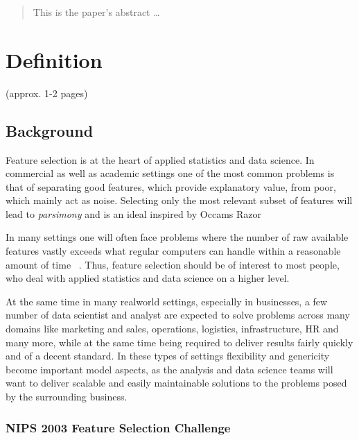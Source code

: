 \documentclass[12pt]{article}
\begin{document}
\maketitle


\begin{abstract}
This is the paper's abstract \ldots
\end{abstract}

\tableofcontents


\section{Definition}\label{definition}

(approx. 1-2 pages)

\subsection{Background}
Feature selection is at the heart of applied statistics and data science. In commercial as well as academic settings one of the most common problems is that of separating good features, which provide explanatory value, from poor, which mainly act as noise. Selecting only the most relevant subset of features will lead to \emph{parsimony} and is an ideal inspired by Occams Razor ~\cite{wiki:occam}

In many settings one will often face problems where the number of raw available features vastly exceeds what regular computers can handle within a reasonable amount of time ~\cite{mboostintro}. Thus, feature selection should be of interest to most people, who deal with applied statistics and data science on a higher level.

At the same time in many realworld settings, especially in businesses, a few number of data scientist and analyst are expected to solve problems across many domains like marketing and sales, operations, logistics, infrastructure, HR and many more, while at the same time being required to deliver results fairly quickly and of a decent standard. In these types of settings flexibility and genericity become important model aspects, as the analysis and data science teams will want to deliver scalable and easily maintainable solutions to the problems posed by the surrounding business.

\subsubsection{NIPS 2003 Feature Selection Challenge}
\end{document}
